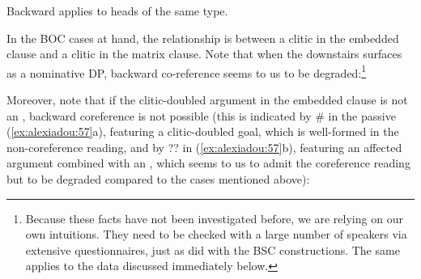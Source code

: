 \documentclass[output=paper]{langsci/langscibook}
\begin{document}
\ea%
    \label{ex:alexiadou:55}
    Backward  applies to heads of the same type. 
\z

In the BOC cases at hand, the relationship is between a clitic in the embedded clause and a clitic in the matrix clause. Note that when the downstairs  surfaces as a nominative DP, backward co-reference seems to us to be degraded:\footnote{Because these facts have not been investigated before, we are relying on our own intuitions. They need to be checked with a large number of speakers via extensive questionnaires, just as \citet{Tsakali2017} did with the BSC constructions. The same applies to the data discussed immediately below.} 

    \z

Moreover, note that if the clitic-doubled argument in the embedded clause is not an , backward coreference is not possible (this is indicated by \# in the passive (\ref{ex:alexiadou:57}a), featuring a clitic-doubled goal, which is well-formed in the non-coreference reading, and by ?? in (\ref{ex:alexiadou:57}b), featuring an affected argument combined with an , which seems to us to admit the coreference reading but to be degraded compared to the  cases mentioned above):

\ea%
    \label{ex:alexiadou:57}
    \z
\z    
\end{document}
